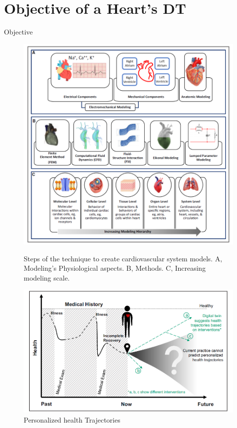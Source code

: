 \documentclass{beamer}
\begin{document}
\section{Objective of a Heart's DT}
\begin{frame}{Objective}
\begin{figure}
    \centering
    \begin{minipage}{0.55\linewidth}
        \centering
        \includegraphics[width=0.6\linewidth]{images/creation_cv_system_models.png}
        \caption{Steps of the technique to create cardiovascular system models. \cite{sel2024digital} 
        \newline
        A, Modeling's Physiological aspects. B, Methods. C, Increasing modeling scale.}
        \label{fig:step_creation_computational_model}
    \end{minipage}\hfill
    \begin{minipage}{0.40\linewidth}
        \centering
        \includegraphics[width=1\linewidth]{images/DT_perso_health_trajectories.png}
        \caption{Personalized health Trajectories \cite{sel2024digital}}
        \label{fig:traject_perso}
    \end{minipage}
\end{figure}
\end{frame}
\end{document}
